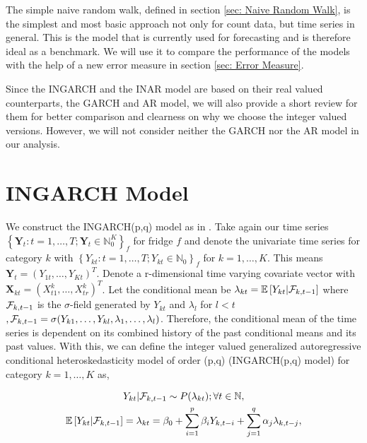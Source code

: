 The simple naive random walk, defined in section \ref{sec: Naive Random Walk}, is the simplest and most basic approach not only for count data, but time series in general. This is the model that is currently used for forecasting and is therefore ideal as a benchmark. We will use it to compare the performance of the models with the help of a new error measure in section \ref{sec: Error Measure}. 

Since the INGARCH and the INAR model are based on their real valued counterparts, the GARCH and AR model, we will also provide a short review for them for better comparison and clearness on why we choose the integer valued versions. However, we will not consider neither the GARCH nor the AR model in our analysis. 

\section{INGARCH Model}
\label{sec:Ingarch}

We construct the INGARCH(p,q) model as in \cite{Liboschik:2016}. 
Take again our time series $\left\{\bm{Y}_t:t=1,\ldots,T; \bm{Y}_t \in \mathbb{N}_0^K \right\}_f$ for fridge $f$ and denote the univariate time series for category $k$ with $\left\{Y_{kt}:t=1,\ldots,T; Y_{kt} \in \mathbb{N}_0\right\}_f$  for $k=1,\ldots,K$. This means $\bm{Y}_t = (Y_{1t},\ldots,Y_{Kt})^T$. Denote a r-dimensional time varying covariate vector with $\textbf{X}_{kt}=(X_{t1}^k,\ldots,X_{tr}^k)^T$. Let the conditional mean be $\lambda_{kt} = \mathbb{E}\left[Y_{kt} | \mathcal{F}_{k,t-1} \right]$ where $\mathcal{F}_{k,t-1}$ is the $\sigma$-field generated by $Y_{kt}$ and $\lambda_l$ for $l<t$ $, \mathcal{F} _{k,t-1}= \sigma(Y_{k1},\ldots,Y_{kl},\lambda_1, \ldots, \lambda_l)$. Therefore, the conditional mean of the time series is dependent on its combined history of the past conditional means and its past values. With this, we can define the integer valued generalized autoregressive conditional heteroskedasticity model of order (p,q) (INGARCH(p,q) model) for category $k=1,\ldots,K$ as,

\begin{equation}
\begin{gathered}
\label{eq:Ingarch model}
Y_{kt} | \mathcal{F}_{k,t-1} \sim P(\lambda_{kt}); \forall t \in \mathbb{N}, \\
\mathbb{E}\left[Y_{kt} | \mathcal{F}_{k,t-1} \right] = \lambda_{kt} = \beta_0 + \sum_{i=1}^p\beta_i Y_{k,t-i} + \sum_{j=1}^q\alpha_j \lambda_{k,t-j},
\end{gathered}
\end{equation}


